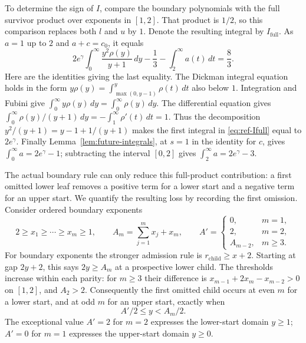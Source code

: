 To determine the sign of $I$, compare the boundary polynomials with
the full survivor product over exponents in $[1,2]$.  That product is
$1/2$, so this comparison replaces both $l$ and $u$ by $1$.
Denote the resulting integral by $I_{\mathrm{full}}$.  As $a=1$ up to
$2$ and $a+c=c_0$, it equals
\begin{equation}\label{eq:ref-Ifull}
 2e^\gamma\int_0^\infty\frac{y^2\rho(y)}{y+1}\,dy
           -\frac13-\int_2^\infty a(t)\,dt=\frac83.
\end{equation}
Here are the identities giving the last equality.  The Dickman
integral equation holds in the form
$y\rho(y)=\int_{\max(0,y-1)}^y\rho(t)\,dt$ also below $1$.
Integration and Fubini give
$\int_0^\infty y\rho(y)\,dy=\int_0^\infty\rho(y)\,dy$.
The differential equation gives
$\int_0^\infty\rho(y)/(y+1)\,dy=-\int_1^\infty\rho'(t)\,dt=1$.
Thus the decomposition
$y^2/(y+1)=y-1+1/(y+1)$ makes the first integral in
\eqref{eq:ref-Ifull} equal to $2e^\gamma$.  Finally
Lemma~\ref{lem:future-integrals}, at $s=1$ in the identity for $c$,
gives $\int_0^\infty a=2e^\gamma-1$; subtracting the interval $[0,2]$
gives $\int_2^\infty a=2e^\gamma-3$.

The actual boundary rule can only reduce this full-product contribution:
a first omitted lower leaf removes a positive term for a lower start
and a negative term for an upper start.  We quantify the resulting loss
by recording the first omission.  Consider ordered boundary exponents
\[
 2\geq x_1\geq\cdots\geq x_m\geq1,\qquad
 A_m=\sum_{j=1}^m x_j+x_m,\qquad
 A'=
 \begin{cases}
  0,&m=1,\\
  2,&m=2,\\
  A_{m-2},&m\geq3.
 \end{cases}
\]
For boundary exponents the stronger admission rule is
$r_{\mathrm{child}}\geq x+2$.  Starting at gap $2y+2$, this says
$2y\geq A_m$ at a prospective lower child.  The thresholds increase
within each parity: for $m\geq3$ their difference is
$x_{m-1}+2x_m-x_{m-2}>0$ on $[1,2]$, and $A_2>2$.
Consequently the first omitted child occurs at even $m$ for a lower
start, and at odd $m$ for an upper start, exactly when
\begin{equation}\label{eq:ref-omission-window}
                     A'/2\leq y<A_m/2.
\end{equation}
The exceptional value $A'=2$ for $m=2$ expresses the lower-start
domain $y\geq1$; $A'=0$ for $m=1$ expresses the upper-start domain
$y\geq0$.

